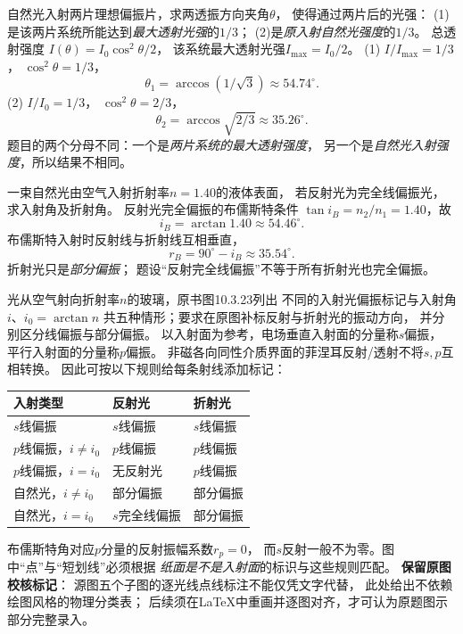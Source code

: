 \problemtext 自然光入射两片理想偏振片，求两透振方向夹角$\theta$，
使得通过两片后的光强：
(1)是该两片系统所能达到\emph{最大透射光强}的$1/3$；
(2)是\emph{原入射自然光强度}的$1/3$。
\workings
总透射强度
$I(\theta)=I_0\cos^2\theta/2$，
该系统最大透射光强$I_{\max}=I_0/2$。
(1) $I/I_{\max}=1/3$，
$\cos^2\theta=1/3$，
\[
\boxed{\theta_1=\arccos(1/\sqrt3)\approx54.74^\circ}.
\]
(2) $I/I_0=1/3$，
$\cos^2\theta=2/3$，
\[
\boxed{\theta_2=\arccos\sqrt{2/3}\approx35.26^\circ}.
\]
\crosscheck 题目的两个分母不同：一个是\emph{两片系统的最大透射强度}，
另一个是\emph{自然光入射强度}，所以结果不相同。

\problemtext 一束自然光由空气入射折射率$n=1.40$的液体表面，
若反射光为完全线偏振光，求入射角及折射角。
\workings
反射光完全偏振的布儒斯特条件
$\tan i_B=n_2/n_1=1.40$，故
\[
\boxed{i_B=\arctan1.40\approx54.46^\circ}.
\]
布儒斯特入射时反射线与折射线互相垂直，
\[
\boxed{r_B=90^\circ-i_B\approx35.54^\circ}.
\]
\crosscheck 折射光只是\emph{部分偏振}；
题设“反射完全线偏振”不等于所有折射光也完全偏振。

\problemtext 光从空气射向折射率$n$的玻璃，原书图10.3.23列出
不同的入射光偏振标记与入射角$i$、$i_0=\arctan n$
共五种情形；要求在原图补标反射与折射光的振动方向，
并分别区分线偏振与部分偏振。
\workings
以入射面为参考，电场垂直入射面的分量称$s$偏振，
平行入射面的分量称$p$偏振。
非磁各向同性介质界面的菲涅耳反射/透射不将$s,p$互相转换。
因此可按以下规则给每条射线添加标记：
\begin{center}
\begin{tabular}{lll}
\hline
入射类型 & 反射光 & 折射光\\
\hline
$s$线偏振 & $s$线偏振 & $s$线偏振\\
$p$线偏振，$i\ne i_0$ & $p$线偏振 & $p$线偏振\\
$p$线偏振，$i=i_0$ & 无反射光 & $p$线偏振\\
自然光，$i\ne i_0$ & 部分偏振 & 部分偏振\\
自然光，$i=i_0$ & $s$完全线偏振 & 部分偏振\\
\hline
\end{tabular}
\end{center}
布儒斯特角对应$p$分量的反射振幅系数$r_p=0$，
而$s$反射一般不为零。图中“点”与“短划线”必须根据
\emph{纸面是不是入射面}的标识与这些规则匹配。
\crosscheck \textbf{保留原图校核标记}：
源图五个子图的逐光线点线标注不能仅凭文字代替，
此处给出不依赖绘图风格的物理分类表；
后续须在LaTeX中重画并逐图对齐，才可认为原题图示部分完整录入。
